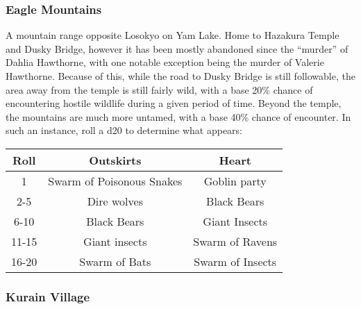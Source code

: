 \subsubsection{Eagle Mountains}
\label{places:eaglemountains}
A mountain range opposite Losokyo on Yam Lake. Home to Hazakura Temple and Dusky Bridge, however it has been mostly abandoned since the ``murder'' of Dahlia Hawthorne, with one notable exception being the murder of Valerie Hawthorne. Because of this, while the road to Dusky Bridge is still followable, the area away from the temple is still fairly wild, with a base 20\% chance of encountering hostile wildlife during a given period of time. Beyond the temple, the mountains are much more untamed, with a base 40\% chance of encounter.  In such an instance, roll a d20 to determine what appears:\\
\begin{center}
\begin{tabular}{c c c}
Roll & Outskirts & Heart \\\hline
1 & Swarm of Poisonous Snakes  & Goblin party \\
2-5 & Dire wolves & Black Bears \\
6-10 & Black Bears & Giant Insects \\
11-15 & Giant insects & Swarm of Ravens \\
16-20 & Swarm of Bats  & Swarm of Insects \end{tabular}\end{center}

\subsubsection{Kurain Village}
\label{places:kurain}

